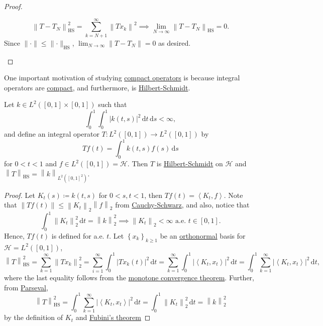 \begin{proof}
\begin{enumerate}
			\[
				\left\lVert T - T_{N} \right\rVert ^{2} _{\mathrm{HS} }= \sum_{k=N+1}^{\infty} \left\lVert T x_{k} \right\rVert ^{2}
				\implies \lim_{N \to \infty} \left\lVert T - T_{N} \right\rVert _{\mathrm{HS} }= 0.
			\]
			Since \(\lVert \cdot \rVert \leq \lVert \cdot \rVert _{\mathrm{HS} }\), \(\lim_{N \to \infty} \left\lVert T - T_N\right\rVert = 0\) as desired.
	\end{enumerate}
\end{proof}

One important motivation of studying \hyperref[def:compact-op]{compact operators} is because integral operators are \hyperref[def:compact-op]{compact}, and furthermore, is \hyperref[def:Hilbert-Schmidt-op]{Hilbert-Schmidt}.
\begin{proposition}\label{prop:Hilbert-Schmidt-integral-op}
	Let \(k\in L^2([0, 1]\times [0, 1])\) such that
	\[
		\int _0^1 \int _0^1 \left\vert k(t, s) \right\vert ^{2} \,\mathrm{d} t\,\mathrm{d} s < \infty,
	\]
	and define an integral operator \(T\colon L^2([0, 1])\to L^2([0, 1])\) by
	\[
		Tf(t) = \int _0^1 k(t, s)f(s)\,\mathrm{d} s
	\]
	for \(0 < t < 1\) and \(f\in L^2([0, 1])= \mathcal{H} \). Then \(T\) is \hyperref[def:Hilbert-Schmidt-op]{Hilbert-Schmidt} on \(\mathcal{H} \) and \(\left\lVert T\right\rVert _{\mathrm{HS} }= \left\lVert k\right\rVert _{L^2([0, 1]^2)}\).
\end{proposition}
\begin{proof}
	Let \(K_t(s) \coloneqq k(t, s)\) for \(0<s, t<1\), then \(Tf(t) = \left\langle K_t, f \right\rangle \). Note that \(\left\lVert Tf(t)\right\rVert \leq \left\lVert K_t\right\rVert _2 \left\lVert f\right\rVert _2\) from \hyperref[thm:Cauchy-Schwarz-ineq]{Cauchy-Schwarz}, and also, notice that
	\[
		\int_{0}^{1} \left\lVert K_t\right\rVert ^2_2 \,\mathrm{d}t = \left\lVert k\right\rVert _2^2 \implies \left\lVert K_t\right\rVert _2<\infty \text{ a.e. }t\in [0,1].
	\]
	Hence, \(Tf(t)\) is defined for a.e. \(t\). Let \(\left\{ x_k \right\} _{k \geq 1}\) be an \hyperref[def:orthonormal-system]{orthonormal} basis for \(\mathcal{H} =L^2([0, 1])\),
	\[
		\left\lVert T\right\rVert ^2 _{\mathrm{HS} }
		= \sum_{k=1}^{\infty} \left\lVert T x_{k} \right\rVert _2^2
		= \sum_{i=1}^{\infty} \int _0^1 \left\vert T x_{k} (t) \right\vert ^2 \,\mathrm{d} t
		= \sum_{k=1}^{\infty} \int _0^1 \left\vert \left\langle K_{t} , x_{t}  \right\rangle  \right\vert ^2 \,\mathrm{d} t
		= \int _0^1 \sum_{k=1}^{\infty}\left\vert \left\langle K_{t} , x_{t}  \right\rangle  \right\vert ^2 \,\mathrm{d} t ,
	\]
	where the last equality follows from the \href{https://en.wikipedia.org/wiki/Monotone_convergence_theorem}{monotone convergence theorem}. Further, from \hyperref[col:Parseval]{Parseval},
	\[
		\left\lVert T\right\rVert ^2 _{\mathrm{HS} }
		= \int _0^1 \sum_{k=1}^{\infty}\left\vert \left\langle K_{t} , x_{t}  \right\rangle  \right\vert ^2 \,\mathrm{d} t
		= \int _0^1 \left\lVert K_t\right\rVert _2^2 \,\mathrm{d} t
		= \left\lVert k\right\rVert _2^2
	\]
	by the definition of \(K_t\) and \href{https://en.wikipedia.org/wiki/Fubini's_theorem}{Fubini's theorem}
\end{proof}

